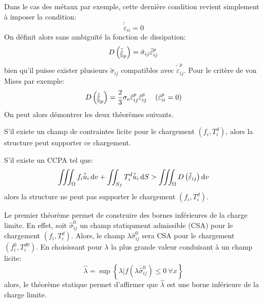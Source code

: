 Dans le cas des métaux par exemple, cette dernière condition revient simplement à imposer la condition: 
\begin{equation}
    \tilde{\dot{\varepsilon}}_{ii} = 0
    \label{eq:Ch10-055}
\end{equation}
On définit alors sans ambiguïté la fonction de dissipation: 
\begin{equation}
    D\left( \tilde{\dot{\underline{\underline{\varepsilon}}}}_p \right) = \tilde{\sigma}_{ij} \tilde{\dot{\varepsilon}}_{ij}^p
    \label{eq:Ch10-056}
\end{equation}
bien qu'il puisse exister plusieurs $\tilde{\sigma}_{ij}$ compatibles avec $\tilde{\dot{\varepsilon}}_{ij}^p$.
Pour le critère de von Mises par exemple: 
\begin{equation}
    D\left( \tilde{\dot{\underline{\underline{\varepsilon}}}}_p \right) = \frac{2}{3} \sigma_e \tilde{\varepsilon}_{ij}^p \tilde{\varepsilon}_{ij}^p \quad \left( \dot{\varepsilon}_{ii}^p = 0 \right)
    \label{eq:Ch10-057}
\end{equation}
On peut alors démontrer les deux thêorèmes suivants.
\begin{thmn}
    S'il existe un champ de contraintes licite pour le chargement $\left( f_i, T_i^d \right)$, alors la structure peut supporter ce chargement.
\end{thmn}
\begin{thmn}
    S'il existe un CCPA  tel que: 
    \begin{equation}
        \iiint_{\Omega} f_i \tilde{\dot{u}}_i \mathop{\mathrm{{}d}}\mathopen{} v + \iint_{S_f} T_i^d \tilde{\dot{u}}_i \mathop{\mathrm{{}d}}\mathopen{} S > \iiint_{\Omega} D \left( \tilde{\dot{\varepsilon}}_{ij} \right) \mathop{\mathrm{{}d}}\mathopen{} v
        \label{eq:Ch10-058}
    \end{equation}
    alors la structure ne peut pas supporter le chargement $\left( f_i, T_i^d \right)$.
\end{thmn}
Le premier théorème permet de construire des bornes inférieures de la charge limite.
En effet, soit $\hat{\sigma}_{ij}^0$ un champ statiqument admissible (CSA) pour le chargement $\left( f_i, T_i^d \right)$.
Alors, le champ $\lambda \hat{\sigma}_{ij}^0$ sera CSA pour le chargement $\left( f^0_i, T_i^{d0} \right)$.
En choisissant pour $\lambda$ la plus grande valeur conduisant à un champ licite: 
\begin{equation}
    \hat{\lambda} = \sup \left\{ \lambda | f\left( \lambda \hat{\sigma}_{ij}^0 \right) \leq 0\ \forall x \right\}
    \label{eq:Ch10-059}
\end{equation}
alors, le théorème statique permet d'affirmer que $\hat{\lambda}$ est une borne inférieure de la charge limite. 

